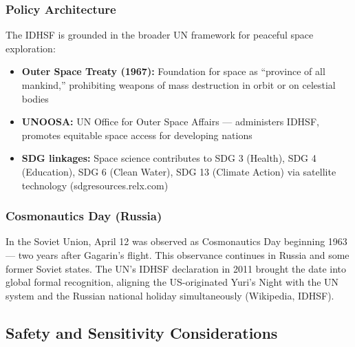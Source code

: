 \documentclass[11pt,letterpaper]{article}
\begin{document}
\subsubsection{Policy Architecture}

The IDHSF is grounded in the broader UN framework for peaceful space exploration:
\begin{itemize}[leftmargin=*]
  \item \textbf{Outer Space Treaty (1967):} Foundation for space as ``province of all mankind,'' prohibiting weapons of mass destruction in orbit or on celestial bodies
  \item \textbf{UNOOSA:} UN Office for Outer Space Affairs — administers IDHSF, promotes equitable space access for developing nations
  \item \textbf{SDG linkages:} Space science contributes to SDG 3 (Health), SDG 4 (Education), SDG 6 (Clean Water), SDG 13 (Climate Action) via satellite technology (sdgresources.relx.com)
\end{itemize}

\subsubsection{Cosmonautics Day (Russia)}

In the Soviet Union, April 12 was observed as Cosmonautics Day beginning 1963 — two years after Gagarin's flight. This observance continues in Russia and some former Soviet states. The UN's IDHSF declaration in 2011 brought the date into global formal recognition, aligning the US-originated Yuri's Night with the UN system and the Russian national holiday simultaneously (Wikipedia, IDHSF).

\subsection{Safety and Sensitivity Considerations}
\end{document}

